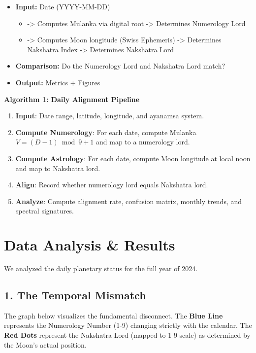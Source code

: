 \documentclass[
  11pt,
  a4paper,
  oneside,
  openany]{report}
\providecommand{\tightlist}{%
  \setlength{\itemsep}{0pt}\setlength{\parskip}{0pt}}\usepackage{longtable,booktabs,array}
\begin{document}
\begin{itemize}
\tightlist
\item
  \textbf{Input:} Date (YYYY-MM-DD)

  \begin{itemize}
  \tightlist
  \item
    -\textgreater{} Computes Mulanka via digital root -\textgreater{}
    Determines Numerology Lord
  \item
    -\textgreater{} Computes Moon longitude (Swiss Ephemeris)
    -\textgreater{} Determines Nakshatra Index -\textgreater{}
    Determines Nakshatra Lord
  \end{itemize}
\item
  \textbf{Comparison:} Do the Numerology Lord and Nakshatra Lord match?
\item
  \textbf{Output:} Metrics + Figures
\end{itemize}

\textbf{Algorithm 1: Daily Alignment Pipeline}

\begin{enumerate}
\def\labelenumi{\arabic{enumi}.}
\tightlist
\item
  \textbf{Input}: Date range, latitude, longitude, and ayanamsa system.
\item
  \textbf{Compute Numerology}: For each date, compute Mulanka
  \(V = (D-1) \bmod 9 + 1\) and map to a numerology lord.
\item
  \textbf{Compute Astrology}: For each date, compute Moon longitude at
  local noon and map to Nakshatra lord.
\item
  \textbf{Align}: Record whether numerology lord equals Nakshatra lord.
\item
  \textbf{Analyze}: Compute alignment rate, confusion matrix, monthly
  trends, and spectral signatures.
\end{enumerate}

\chapter{Data Analysis \& Results}\label{data-analysis-results}

We analyzed the daily planetary status for the full year of 2024.

\section{1. The Temporal Mismatch}\label{the-temporal-mismatch}

The graph below visualizes the fundamental disconnect. The \textbf{Blue
Line} represents the Numerology Number (1-9) changing strictly with the
calendar. The \textbf{Red Dots} represent the Nakshatra Lord (mapped to
1-9 scale) as determined by the Moon's actual position.
\end{document}
